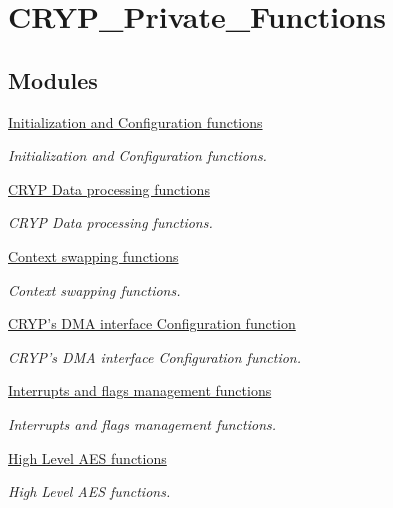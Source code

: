 \hypertarget{group___c_r_y_p___private___functions}{}\section{C\+R\+Y\+P\+\_\+\+Private\+\_\+\+Functions}
\label{group___c_r_y_p___private___functions}
\subsection*{Modules}
\begin{DoxyCompactItemize}
\item 
\hyperlink{group___c_r_y_p___group1}{Initialization and Configuration functions}
\begin{DoxyCompactList}\small\item\em Initialization and Configuration functions. \end{DoxyCompactList}\item 
\hyperlink{group___c_r_y_p___group2}{C\+R\+Y\+P Data processing functions}
\begin{DoxyCompactList}\small\item\em C\+R\+Y\+P Data processing functions. \end{DoxyCompactList}\item 
\hyperlink{group___c_r_y_p___group3}{Context swapping functions}
\begin{DoxyCompactList}\small\item\em Context swapping functions. \end{DoxyCompactList}\item 
\hyperlink{group___c_r_y_p___group4}{C\+R\+Y\+P's D\+M\+A interface Configuration function}
\begin{DoxyCompactList}\small\item\em C\+R\+Y\+P's D\+M\+A interface Configuration function. \end{DoxyCompactList}\item 
\hyperlink{group___c_r_y_p___group5}{Interrupts and flags management functions}
\begin{DoxyCompactList}\small\item\em Interrupts and flags management functions. \end{DoxyCompactList}\item 
\hyperlink{group___c_r_y_p___group6}{High Level A\+E\+S functions}
\begin{DoxyCompactList}\small\item\em High Level A\+E\+S functions. \end{DoxyCompactList}\item 

\end{DoxyCompactItemize}
